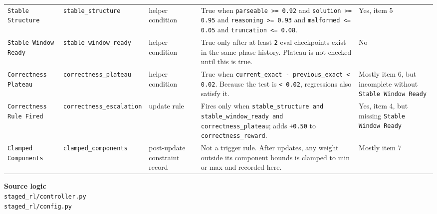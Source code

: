 \documentclass[11pt]{article}
\newcommand{\rulekey}[1]{\nolinkurl{#1}}
\begin{document}
\begin{longtable}{L{0.17\textwidth} L{0.18\textwidth} L{0.11\textwidth} L{0.30\textwidth} L{0.14\textwidth}}
\texttt{Stable Structure} &
\rulekey{stable_structure} &
helper condition &
True when \texttt{parseable >= 0.92} and \texttt{solution >= 0.95} and \texttt{reasoning >= 0.93} and \texttt{malformed <= 0.05} and \texttt{truncation <= 0.08}. &
Yes, item 5 \\

\texttt{Stable Window Ready} &
\rulekey{stable_window_ready} &
helper condition &
True only after at least \texttt{2} eval checkpoints exist in the same phase history. Plateau is not checked until this is true. &
No \\

\texttt{Correctness Plateau} &
\rulekey{correctness_plateau} &
helper condition &
True when \texttt{current\_exact - previous\_exact < 0.02}. Because the test is \texttt{< 0.02}, regressions also satisfy it. &
Mostly item 6, but incomplete without \texttt{Stable Window Ready} \\

\texttt{Correctness Rule Fired} &
\rulekey{correctness_escalation} &
update rule &
Fires only when \texttt{stable\_structure and stable\_window\_ready and correctness\_plateau}; adds \texttt{+0.50} to \texttt{correctness\_reward}. &
Yes, item 4, but missing \texttt{Stable Window Ready} \\

\texttt{Clamped Components} &
\rulekey{clamped_components} &
post-update constraint record &
Not a trigger rule. After updates, any weight outside its component bounds is clamped to min or max and recorded here. &
Mostly item 7 \\
\bottomrule
\end{longtable}

\vspace{0.5em}
\noindent\textbf{Source logic}\\
\texttt{staged\_rl/controller.py}\\
\texttt{staged\_rl/config.py}
\end{document}

